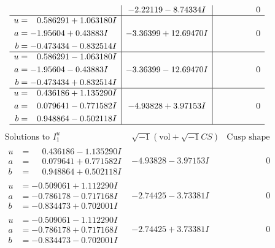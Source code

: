 \documentclass[1p]{elsarticle_modified}
\theoremstyle{definition}
\newcommand{\I}{\sqrt{-1}}
\begin{document}
$$\begin{array}{c|c|c}
 & -2.22119 - 8.74334 I & \phantom{-0.000000 } 0 \\ \hline\begin{aligned}
u &= \phantom{-}0.586291 + 1.063180 I \\
a &= -1.95604 + 0.43883 I \\
b &= -0.473434 - 0.832514 I\end{aligned}
 & -3.36399 + 12.69470 I & \phantom{-0.000000 } 0 \\ \hline\begin{aligned}
u &= \phantom{-}0.586291 - 1.063180 I \\
a &= -1.95604 - 0.43883 I \\
b &= -0.473434 + 0.832514 I\end{aligned}
 & -3.36399 - 12.69470 I & \phantom{-0.000000 } 0 \\ \hline\begin{aligned}
u &= \phantom{-}0.436186 + 1.135290 I \\
a &= \phantom{-}0.079641 - 0.771582 I \\
b &= \phantom{-}0.948864 - 0.502118 I\end{aligned}
 & -4.93828 + 3.97153 I & \phantom{-0.000000 } 0\\
 \hline 
 \end{array}$$\newpage$$\begin{array}{c|c|c}  
\text{Solutions to }I^u_{1}& \I (\text{vol} + \sqrt{-1}CS) & \text{Cusp shape}\\
 \hline 
\begin{aligned}
u &= \phantom{-}0.436186 - 1.135290 I \\
a &= \phantom{-}0.079641 + 0.771582 I \\
b &= \phantom{-}0.948864 + 0.502118 I\end{aligned}
 & -4.93828 - 3.97153 I & \phantom{-0.000000 } 0 \\ \hline\begin{aligned}
u &= -0.509061 + 1.112290 I \\
a &= -0.786178 - 0.717168 I \\
b &= -0.834473 + 0.702001 I\end{aligned}
 & -2.74425 - 3.73381 I & \phantom{-0.000000 } 0 \\ \hline\begin{aligned}
u &= -0.509061 - 1.112290 I \\
a &= -0.786178 + 0.717168 I \\
b &= -0.834473 - 0.702001 I\end{aligned}
 & -2.74425 + 3.73381 I & \phantom{-0.000000 } 0 \\ \hline\begin{aligned}

\end{aligned}
\end{array}$$
\end{document}
